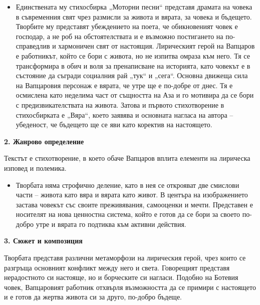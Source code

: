 \documentclass[12pt,a4paper]{article}
\begin{document}
\begin{itemize}[leftmargin=*]
\vspace{-0.2cm}
\item Единствената му стихосбирка „Моторни песни“ представя драмата на човека в съвременния свят чрез размисли за живота и вярата, за човека и бъдещето. Творбите му представят убеждението на поета, че обикновеният човек е господар, а не роб на обстоятелствата и е възможно постигането на по-справедлив и хармоничен свят от настоящия. Лирическият герой на Вапцаров е работникът, който се бори с живота, но не изпитва омраза към него. Тя се трансформира в обич и воля за пренаписване на историята, като човекът е в състояние да съгради социалния рай „тук“ и „сега“. Основна движеща сила на Вапцаровия персонаж е вярата, че утре ще е по-добре от днес. Тя е осмислена като неделима част от същността на Аза и го мотивира да се бори с предизвикателствата на живота. Затова и първото стихотворение в стихосбирката е „Вяра“, което заявява и основната нагласа на автора – убеденост, че бъдещето ще се яви като коректив на настоящето.
\end{itemize}
 
\noindent 
\textbf{2. Жанрово определение}
\vspace{0.1cm}

\indent Текстът е стихотворение, в което обаче Вапцаров вплита елементи на лирическа изповед и полемика. 

\begin{itemize}[leftmargin=*]
\vspace{-0.2cm}
\item Творбата няма строфично деление, като в нея се открояват две смислови части – живота като вяра и вярата като живот. В центъра на изображението застава човекът със своите преживявания, самооценки и мечти. Представен е носителят на нова ценностна система, който е готов да се бори за своето по-добро утре и вярата го подтиква към активни действия. 
\end{itemize}

\noindent 
\textbf{3. Сюжет и композиция}
\vspace{0.1cm}
 
\indent Творбата представя различни метаморфози на лирическия герой, чрез които се разгръща основният конфликт между него и света. Говорещият представя нерадостното си настояще, но и борческите си нагласи. Подобно на Ботевия човек, Вапцаровият работник отхвърля възможността да се примири с настоящето и е готов да жертва живота си за друго, по-добро бъдеще.
\end{document}
